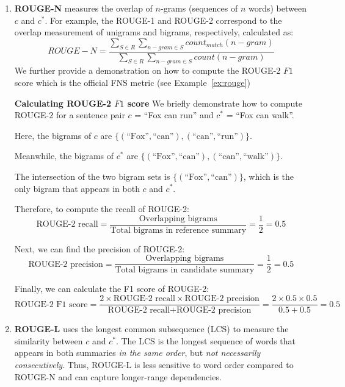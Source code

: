 \begin{enumerate}
    \item \textbf{ROUGE-N} measures the overlap of $n$-grams (sequences of $n$ words) between $c$ and $c^{*}$.
    For example, the ROUGE-1 and ROUGE-2 correspond to the overlap measurement of unigrams and bigrams, respectively, calculated as:
    \begin{equation}\label{eq:rouge_formula}
        ROUGE-N = \frac{\sum_{S \in R} \sum_{n-gram \in S} count_{match}(n-gram)}{\sum_{S \in R} \sum_{n-gram \in S} count(n-gram)}
    \end{equation}
    We further provide a demonstration on how to compute the ROUGE-2 $F1$ score which is the official FNS metric (see Example~\ref{ex:rouge})
    \begin{beaux_exemples}{\textbf{Calculating ROUGE-2 $F1$ score}}\label{ex:rouge}
        We briefly demonstrate how to compute ROUGE-2 for a sentence pair $c$ = ``Fox can run'' and $c^{*}$ = ``Fox can walk''.

        Here, the bigrams of $c$ are $\{(\text{``Fox''}, \text{``can''}), (\text{``can''}, \text{``run''})\}$.

        Meanwhile, the bigrams of $c^{*}$ are $\{(\text{``Fox''}, \text{``can''}), (\text{``can''}, \text{``walk''})\}$.

        The intersection of the two bigram sets is $\{(\text{``Fox''}, \text{``can''})\}$, which is the only bigram that appears in both $c$ and $c^{*}$.

        Therefore, to compute the recall of ROUGE-2:
        \[
            \text{ROUGE-2 recall} = \frac{\text{Overlapping bigrams}}{\text{Total bigrams in reference summary}} = \frac{1}{2}=0.5
        \]

        Next, we can find the precision of ROUGE-2:
        \[
            \text{ROUGE-2 precision} = \frac{\text{Overlapping bigrams}}{\text{Total bigrams in candidate summary}} = \frac{1}{2}=0.5
        \]

        Finally, we can calculate the F1 score of ROUGE-2:
        \[
            \text{ROUGE-2 F1 score} = \frac{2 \times \text{ROUGE-2 recall} \times \text{ROUGE-2 precision}}{\text{ROUGE-2 recall} + \text{ROUGE-2 precision}} = \frac{2 \times 0.5 \times 0.5}{0.5 + 0.5} = 0.5
        \]
    \end{beaux_exemples}
    \item \textbf{ROUGE-L} uses the longest common subsequence (LCS) to measure the similarity between $c$ and $c^{*}$.
    The LCS is the longest sequence of words that appears in both summaries \emph{in the same order}, but \emph{not necessarily consecutively}.
    Thus, ROUGE-L is less sensitive to word order compared to ROUGE-N and can capture longer-range dependencies.
\end{enumerate}

